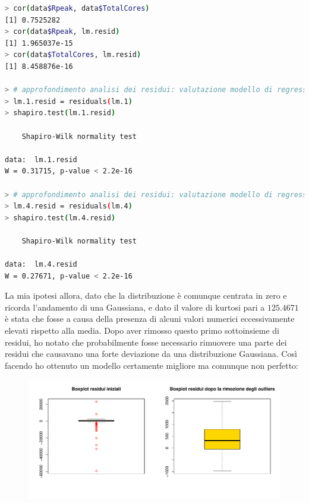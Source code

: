 \documentclass[11pt,a4paper]{article}
\begin{document}
\begin{lstlisting}[language=bash,basicstyle=\tiny,tabsize=2,frame = single]
> cor(data$Rpeak, data$TotalCores)
[1] 0.7525282
> cor(data$Rpeak, lm.resid)
[1] 1.965037e-15
> cor(data$TotalCores, lm.resid)
[1] 8.458876e-16

> # approfondimento analisi dei residui: valutazione modello di regressione lineare con tutti i fattori
> lm.1.resid = residuals(lm.1)
> shapiro.test(lm.1.resid)

	Shapiro-Wilk normality test

data:  lm.1.resid
W = 0.31715, p-value < 2.2e-16

> # approfondimento analisi dei residui: valutazione modello di regressione lineare semplice
> lm.4.resid = residuals(lm.4)
> shapiro.test(lm.4.resid)

	Shapiro-Wilk normality test

data:  lm.4.resid
W = 0.27671, p-value < 2.2e-16
\end{lstlisting}
\vspace{0.2cm}
La mia ipotesi allora, dato che la distribuzione \`e comunque centrata in zero e
ricorda l'andamento di una Gaussiana, e dato il valore di kurtosi pari a
$125.4671$ \`e stata che fosse a causa della presenza di alcuni valori numerici
eccessivamente elevati rispetto alla media. Dopo aver rimosso questo primo
sottoinsieme di residui, ho notato che probabilmente fosse necessario rimuovere
una parte dei residui che causavano una forte deviazione da una distribuzione
Gaussiana. Cos\`i facendo ho ottenuto un modello certamente migliore ma
comunque non perfetto:
\clearpage
\begin{figure}[H]
	\vspace{-1.5cm}
	\begin{center}
		\hspace*{-1.5cm}
		\includegraphics[scale=0.7]{imgs/residuals_boxplots.pdf}
	\end{center}
\end{figure}
\end{document}
